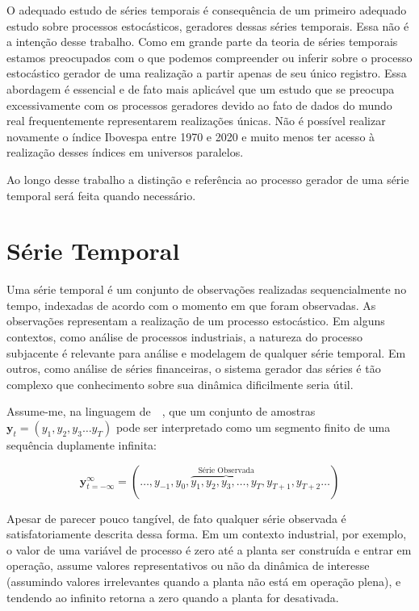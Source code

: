 O adequado estudo de séries temporais é consequência de um primeiro adequado
estudo sobre processos estocásticos, geradores dessas séries temporais. Essa
não é a intenção desse trabalho. Como em grande parte da teoria de séries
temporais estamos preocupados com o que podemos compreender ou inferir sobre
o processo estocástico gerador de uma realização a partir apenas de seu único
registro. Essa abordagem é essencial e de fato mais aplicável que um estudo
que se preocupa excessivamente com os processos geradores devido ao fato de dados
do mundo real frequentemente representarem realizações únicas. Não é possível
realizar novamente o índice Ibovespa entre 1970 e 2020 e muito menos ter acesso
à realização desses índices em universos paralelos.

Ao longo desse trabalho a distinção e referência ao processo gerador de uma série
temporal será feita quando necessário.


\section{Série Temporal}\label{ssec:definition}

Uma série temporal é um conjunto de observações realizadas sequencialmente no
tempo, indexadas de acordo com o momento em que foram observadas. As
observações representam a realização de um processo estocástico. Em alguns
contextos, como análise de processos industriais, a natureza do processo
subjacente é relevante para análise e modelagem de qualquer série temporal. Em
outros, como análise de séries financeiras, o sistema gerador das séries é tão
complexo que conhecimento sobre sua dinâmica dificilmente seria útil.

Assume-me, na linguagem de~~\cite{hamilton}, que um conjunto de amostras
$\mathbf{y}_t = (y_1, y_2, y_3 \dots y_T)$ pode ser interpretado como um
segmento finito de uma sequência duplamente infinita:

$${\mathbf{y}}_{t=-\infty}^{\infty} = ({\dots, y_{-1},y_0, \overbrace{y_1, y_2, y_3, \dots, y_T}^{\text{Série Observada}}, y_{T+1}, y_{T+2}}\dots)$$

\vspace{1cm}

Apesar de parecer pouco tangível, de fato qualquer série observada é
satisfatoriamente descrita dessa forma. Em um contexto industrial, por exemplo,
o valor de uma variável de processo é zero até a planta ser construída e entrar
em operação, assume valores representativos ou não da dinâmica de interesse
(assumindo valores irrelevantes quando a planta não está em operação plena), e
tendendo ao infinito retorna a zero quando a planta for desativada.

